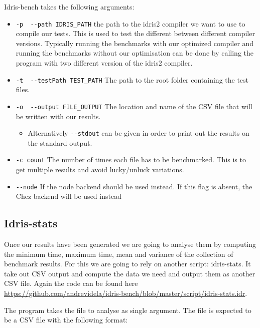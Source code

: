 \documentclass[
]{article}
\providecommand{\tightlist}{%
  \setlength{\itemsep}{0pt}\setlength{\parskip}{0pt}}
\begin{document}
Idris-bench takes the following arguments:

\begin{itemize}
\tightlist
\item
  \texttt{-p\ \textbar{}\ -\/-path\ IDRIS\_PATH} the path to the idris2
  compiler we want to use to compile our tests. This is used to test the
  different between different compiler versions. Typically running the
  benchmarks with our optimized compiler and running the benchmarks
  without our optimisation can be done by calling the program with two
  different version of the idris2 compiler.
\item
  \texttt{-t\ \textbar{}\ -\/-testPath\ TEST\_PATH} The path to the root
  folder containing the test files.
\item
  \texttt{-o\ \textbar{}\ -\/-output\ FILE\_OUTPUT} The location and
  name of the CSV file that will be written with our results.

  \begin{itemize}
  \tightlist
  \item
    Alternatively \texttt{-\/-stdout} can be given in order to print out
    the results on the standard output.
  \end{itemize}
\item
  \texttt{-c\ count} The number of times each file has to be
  benchmarked. This is to get multiple results and avoid lucky/unluck
  variations.
\item
  \texttt{-\/-node} If the node backend should be used instead. If this
  flag is absent, the Chez backend will be used instead
\end{itemize}

\hypertarget{idris-stats}{%
\subsection{Idris-stats}\label{idris-stats}}

Once our results have been generated we are going to analyse them by
computing the minimum time, maximum time, mean and variance of the
collection of benchmark results. For this we are going to rely on
another script: idris-stats. It take out CSV output and compute the data
we need and output them as another CSV file. Again the code can be found
here
\url{https://github.com/andrevidela/idris-bench/blob/master/script/idris-stats.idr}.

The program takes the file to analyse as single argument. The file is
expected to be a CSV file with the following format:
\end{document}
